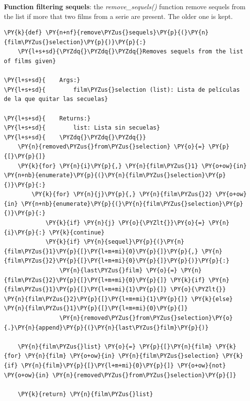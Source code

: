     \textbf{Function filtering sequels}: the \emph{remove\_sequels()}
function remove sequels from the list if more that two films from a
serie are present. The older one is kept.

    \begin{tcolorbox}[breakable, size=fbox, boxrule=1pt, pad at break*=1mm,colback=cellbackground, colframe=cellborder]
\begin{Verbatim}[commandchars=\\\{\}]
\PY{k}{def} \PY{n+nf}{remove\PYZus{}sequels}\PY{p}{(}\PY{n}{film\PYZus{}selection}\PY{p}{)}\PY{p}{:}
    \PY{l+s+sd}{\PYZdq{}\PYZdq{}\PYZdq{}Removes sequels from the list of films given}

\PY{l+s+sd}{    Args:}
\PY{l+s+sd}{        film\PYZus{}selection (list): Lista de películas de la que quitar las secuelas}

\PY{l+s+sd}{    Returns:}
\PY{l+s+sd}{        list: Lista sin secuelas}
\PY{l+s+sd}{    \PYZdq{}\PYZdq{}\PYZdq{}} 
    \PY{n}{removed\PYZus{}from\PYZus{}selection} \PY{o}{=} \PY{p}{[}\PY{p}{]}
    \PY{k}{for} \PY{n}{i}\PY{p}{,} \PY{n}{film\PYZus{}1} \PY{o+ow}{in} \PY{n+nb}{enumerate}\PY{p}{(}\PY{n}{film\PYZus{}selection}\PY{p}{)}\PY{p}{:}
        \PY{k}{for} \PY{n}{j}\PY{p}{,} \PY{n}{film\PYZus{}2} \PY{o+ow}{in} \PY{n+nb}{enumerate}\PY{p}{(}\PY{n}{film\PYZus{}selection}\PY{p}{)}\PY{p}{:}
            \PY{k}{if} \PY{n}{j} \PY{o}{\PYZlt{}}\PY{o}{=} \PY{n}{i}\PY{p}{:} \PY{k}{continue} 
            \PY{k}{if} \PY{n}{sequel}\PY{p}{(}\PY{n}{film\PYZus{}1}\PY{p}{[}\PY{l+m+mi}{0}\PY{p}{]}\PY{p}{,} \PY{n}{film\PYZus{}2}\PY{p}{[}\PY{l+m+mi}{0}\PY{p}{]}\PY{p}{)}\PY{p}{:} 
                \PY{n}{last\PYZus{}film} \PY{o}{=} \PY{n}{film\PYZus{}2}\PY{p}{[}\PY{l+m+mi}{0}\PY{p}{]} \PY{k}{if} \PY{n}{film\PYZus{}1}\PY{p}{[}\PY{l+m+mi}{1}\PY{p}{]} \PY{o}{\PYZlt{}} \PY{n}{film\PYZus{}2}\PY{p}{[}\PY{l+m+mi}{1}\PY{p}{]} \PY{k}{else} \PY{n}{film\PYZus{}1}\PY{p}{[}\PY{l+m+mi}{0}\PY{p}{]}
                \PY{n}{removed\PYZus{}from\PYZus{}selection}\PY{o}{.}\PY{n}{append}\PY{p}{(}\PY{n}{last\PYZus{}film}\PY{p}{)}

    \PY{n}{film\PYZus{}list} \PY{o}{=} \PY{p}{[}\PY{n}{film} \PY{k}{for} \PY{n}{film} \PY{o+ow}{in} \PY{n}{film\PYZus{}selection} \PY{k}{if} \PY{n}{film}\PY{p}{[}\PY{l+m+mi}{0}\PY{p}{]} \PY{o+ow}{not} \PY{o+ow}{in} \PY{n}{removed\PYZus{}from\PYZus{}selection}\PY{p}{]}

    \PY{k}{return} \PY{n}{film\PYZus{}list}   
\end{Verbatim}
\end{tcolorbox}

